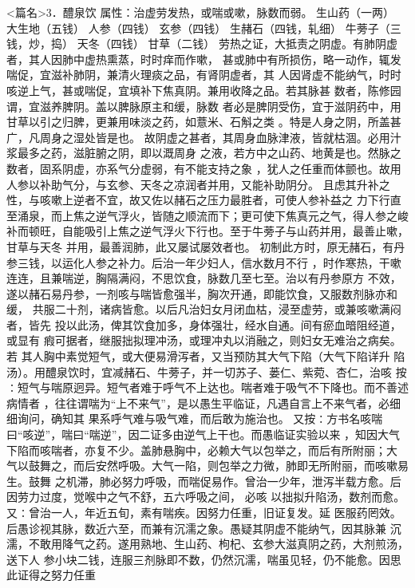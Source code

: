 \documentclass[a4paper,12pt,UTF8,twoside]{ctexbook}
\begin{document}
<篇名>3．醴泉饮
属性：治虚劳发热，或喘或嗽，脉数而弱。 
生山药（一两） 大生地（五钱） 人参（四钱） 玄参（四钱） 生赭石（四钱，轧细） 牛蒡子（三钱，炒，捣） 
天冬（四钱） 甘草（二钱） 
劳热之证，大抵责之阴虚。有肺阴虚者，其人因肺中虚热熏蒸，时时痒而作嗽， 
甚或肺中有所损伤，略一动作，辄发喘促，宜滋补肺阴，兼清火理痰之品，有肾阴虚者，其 
人因肾虚不能纳气，时时咳逆上气，甚或喘促，宜填补下焦真阴。兼用收降之品。若其脉甚 
数者，陈修园谓，宜滋养脾阴。盖以脾脉原主和缓，脉数 
者必是脾阴受伤，宜于滋阴药中，用甘草以引之归脾，更兼用味淡之药，如薏米、石斛之类 
。特是人身之阴，所盖甚广，凡周身之湿处皆是也。 
故阴虚之甚者，其周身血脉津液，皆就枯涸。必用汁浆最多之药，滋脏腑之阴，即以溉周身 
之液，若方中之山药、地黄是也。然脉之数者，固系阴虚，亦系气分虚弱，有不能支持之象 
，犹人之任重而体颤也。故用人参以补助气分，与玄参、天冬之凉润者并用，又能补助阴分。 
且虑其升补之性，与咳嗽上逆者不宜，故又佐以赭石之压力最胜者，可使人参补益之 
力下行直至涌泉，而上焦之逆气浮火，皆随之顺流而下；更可使下焦真元之气，得人参之峻 
补而顿旺，自能吸引上焦之逆气浮火下行也。至于牛蒡子与山药并用，最善止嗽，甘草与天冬 
并用，最善润肺，此又屡试屡效者也。 
初制此方时，原无赭石，有丹参三钱，以运化人参之补力。后治一年少妇人，信水数月不行 
，时作寒热，干嗽连连，且兼喘逆，胸隔满闷，不思饮食，脉数几至七至。治以有丹参原方 
不效，遂以赭石易丹参，一剂咳与喘皆愈强半，胸次开通，即能饮食，又服数剂脉亦和缓， 
共服二十剂，诸病皆愈。以后凡治妇女月闭血枯，浸至虚劳，或兼咳嗽满闷者，皆先 
投以此汤，俾其饮食加多，身体强壮，经水自通。间有瘀血暗阻经道，或显有 
瘕可据者，继服拙拟理冲汤，或理冲丸以消融之，则妇女无难治之病矣。若 
其人胸中素觉短气，或大便易滑泻者，又当预防其大气下陷（大气下陷详升 
陷汤）。用醴泉饮时，宜减赭石、牛蒡子，并一切苏子、蒌仁、紫菀、杏仁，治咳 
按∶短气与喘原迥异。短气者难于呼气不上达也。喘者难于吸气不下降也。而不善述病情者 
，往往谓喘为“上不来气”，是以愚生平临证，凡遇自言上不来气者，必细细询问，确知其 
果系呼气难与吸气难，而后敢为施治也。 
又按∶方书名咳喘曰“咳逆”，喘曰“喘逆”，因二证多由逆气上干也。而愚临证实验以来 
，知因大气下陷而咳喘者，亦复不少。盖肺悬胸中，必赖大气以包举之，而后有所附丽；大 
气以鼓舞之，而后安然呼吸。大气一陷，则包举之力微，肺即无所附丽，而咳嗽易生。鼓舞 
之机滞，肺必努力呼吸，而喘促易作。曾治一少年，泄泻半载方愈。后因劳力过度，觉喉中之气不舒，五六呼吸之间， 
必咳 
以拙拟升陷汤，数剂而愈。 
又∶曾治一人，年近五旬，素有喘疾。因努力任重，旧证复发。延 
医服药罔效。后愚诊视其脉，数近六至，而兼有沉濡之象。愚疑其阴虚不能纳气，因其脉兼 
沉濡，不敢用降气之药。遂用熟地、生山药、枸杞、玄参大滋真阴之药，大剂煎汤，送下人 
参小块二钱，连服三剂脉即不数，仍然沉濡，喘虽见轻，仍不能愈。因思此证得之努力任重 
\end{document}
